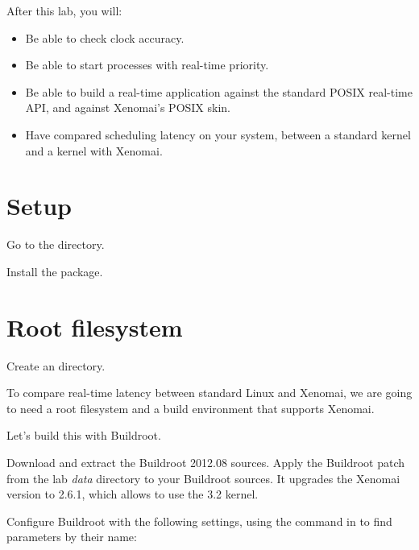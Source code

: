 
After this lab, you will:
\begin{itemize}
\item Be able to check clock accuracy.
\item Be able to start processes with real-time priority.
\item Be able to build a real-time application against the standard
POSIX real-time API, and against Xenomai's POSIX skin.
\item Have compared scheduling latency on your system, between a standard kernel and a kernel with Xenomai.
\end{itemize}

\section{Setup}

Go to the  directory.

Install the  package.

\section{Root filesystem}

Create an  directory.

To compare real-time latency between standard Linux and Xenomai, we
are going to need a root filesystem and a build environment that
supports Xenomai.

Let's build this with Buildroot.

Download and extract the Buildroot 2012.08 sources. Apply the
Buildroot patch 
from the lab {\em data} directory to your Buildroot sources. It
upgrades the Xenomai version to 2.6.1, which allows to use the 3.2
kernel.

Configure Buildroot with the following settings, using the \code{/}
command in  to find parameters by their name:

